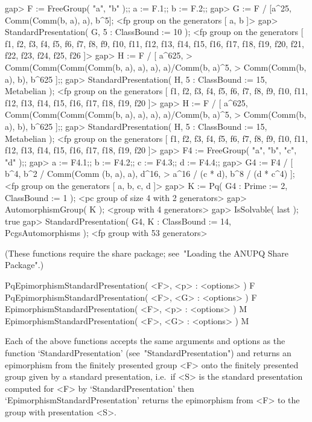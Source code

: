 \beginexample
gap> F := FreeGroup( "a", "b" );; a := F.1;; b := F.2;;
gap> G := F / [a^25, Comm(Comm(b, a), a), b^5];        
<fp group on the generators [ a, b ]>
gap> StandardPresentation( G, 5 : ClassBound := 10 );  
<fp group on the generators [ f1, f2, f3, f4, f5, f6, f7, f8, f9, f10, f11, 
  f12, f13, f14, f15, f16, f17, f18, f19, f20, f21, f22, f23, f24, f25, f26 ]>
gap> H := F / [ a^625,
>               Comm(Comm(Comm(Comm(b, a), a), a), a)/Comm(b, a)^5,
>               Comm(Comm(b, a), b), b^625 ];;
gap> StandardPresentation( H, 5 : ClassBound := 15, Metabelian );
<fp group on the generators [ f1, f2, f3, f4, f5, f6, f7, f8, f9, f10, f11, 
  f12, f13, f14, f15, f16, f17, f18, f19, f20 ]>
gap> H := F / [ a^625, Comm(Comm(Comm(Comm(b, a), a), a), a)/Comm(b, a)^5,
>               Comm(Comm(b, a), b), b^625 ];;                     
gap> StandardPresentation( H, 5 : ClassBound := 15, Metabelian );
<fp group on the generators [ f1, f2, f3, f4, f5, f6, f7, f8, f9, f10, f11, 
  f12, f13, f14, f15, f16, f17, f18, f19, f20 ]>
gap> F4 := FreeGroup( "a", "b", "c", "d" );;                        
gap> a := F4.1;; b := F4.2;; c := F4.3;; d := F4.4;;
gap> G4 := F4 / [ b^4, b^2 / Comm(Comm (b, a), a), d^16,                
>                 a^16 / (c * d), b^8 / (d * c^4) ];
<fp group on the generators [ a, b, c, d ]>
gap> K := Pq( G4 : Prime := 2, ClassBound := 1 );
<pc group of size 4 with 2 generators>
gap> AutomorphismGroup( K );
<group with 4 generators>
gap> IsSolvable( last );
true
gap> StandardPresentation( G4, K : ClassBound := 14, PcgsAutomorphisms );
<fp group with 53 generators>
\endexample

(These functions require the {\ANUPQ}  share  package;  see~"Loading  the
ANUPQ Share Package".)

\>PqEpimorphismStandardPresentation( <F>, <p> : <options> ) F
\>PqEpimorphismStandardPresentation( <F>, <G> : <options> ) F
\>EpimorphismStandardPresentation( <F>, <p> : <options> ) M
\>EpimorphismStandardPresentation( <F>, <G> : <options> ) M

Each of the above functions accepts the same arguments and options as the
function `StandardPresentation' (see~"StandardPresentation") and  returns
an epimorphism from the finitely presented group <F>  onto  the  finitely
presented group given by a standard  presentation,  i.e.~if  <S>  is  the
standard presentation computed for  <F>  by  `StandardPresentation'  then
`EpimorphismStandardPresentation' returns the epimorphism from <F> to the
group with presentation <S>.

